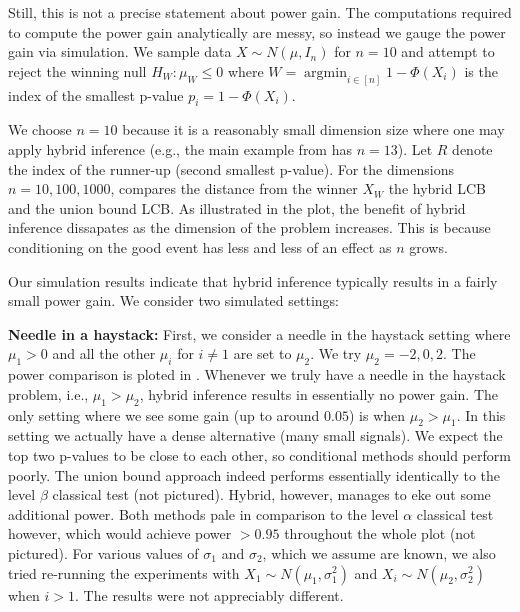 \documentclass{article}
\DeclareMathOperator*{\argmin}{argmin}
\begin{document}
\begin{appendix}
Still, this is not a precise statement about power gain. The computations required to compute the power gain analytically are messy, so instead we gauge the power gain via simulation. We sample data $X \sim N(\mu, I_n)$ for $n=10$ and attempt to reject the winning null $H_W: \mu_W \leq 0$ where $W = \argmin_{i \in [n]} 1 - \Phi(X_i)$ is the index of the smallest p-value $p_i = 1-\Phi(X_i)$.  

We choose $n=10$ because it is a reasonably small dimension size where one may apply hybrid inference (e.g., the main example from \cite{Andrews2023} has $n=13$). Let $R$ denote the index of the runner-up (second smallest p-value). For the dimensions  $n=10, 100, 1000$,  
compares the distance from the winner $X_W$ the hybrid LCB and the union bound LCB. As illustrated in the plot, the benefit of hybrid inference dissapates as the dimension of the problem increases. This is because conditioning on the good event has less and less of an effect as $n$ grows. 

Our simulation results indicate that hybrid inference typically results in a fairly small power gain. We consider two simulated settings: \newline 

\noindent \textbf{Needle in a haystack: } First, we consider a needle in the haystack setting where $\mu_1 > 0$ and all the other $\mu_i$ for $ i\neq 1$ are set to $\mu_2$. We try $\mu_2 = -2, 0, 2$. The power comparison is ploted in . Whenever we truly have a needle in the haystack problem, i.e., $\mu_1 > \mu_2$, hybrid inference results in essentially no power gain. The only setting where we see some gain (up to around $0.05$) is when $\mu_2 > \mu_1$. In this setting  we actually have a dense alternative (many small signals). We expect the top two p-values to be close to each other, so conditional methods should perform poorly. The union bound approach indeed performs essentially identically to the level $\beta$ classical test (not pictured). Hybrid, however, manages to eke out some additional power. Both methods pale in comparison to the level $\alpha$ classical test however, which would achieve power $>0.95$ throughout the whole plot (not pictured). For various values of $\sigma_1$ and $\sigma_2$, which we assume are known, we also tried re-running the experiments with  $X_1 \sim N(\mu_1, \sigma_1^2)$ and $X_i \sim N(\mu_2, \sigma_2^2)$ when $i > 1$. The results were not appreciably different.  \newline 


\end{appendix}
\end{document}
